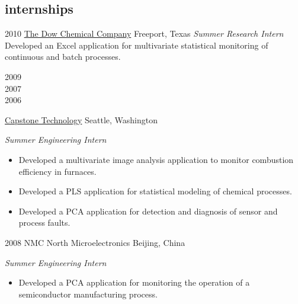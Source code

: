 \documentclass[]{../friggeri-cv} %
\begin{document}

\subsection{internships}

\begin{entrylist}

\entry
{2010}
{\href{http://www.dow.com/}{The Dow Chemical Company}}
{Freeport, Texas}
{\emph{Summer Research Intern} \\
Developed an Excel application for multivariate statistical monitoring of continuous and batch processes.}


\entry
{\begin{minipage}[t]{2cm}2009 \\ 2007 \\ 2006\end{minipage}}
{\href{http://www.capstonetechnology.com}{Capstone Technology}}
{Seattle, Washington}
{\emph{Summer Engineering Intern}
\begin{itemize}
	\item Developed a multivariate image analysis application to monitor combustion efficiency in furnaces.
	\item Developed a PLS application for statistical modeling of chemical processes.
	\item Developed a PCA application for detection and diagnosis of sensor and process faults.
\end{itemize}}


\entry
{2008}
{NMC North Microelectronics}
{Beijing, China}
{\emph{Summer Engineering Intern}
\begin{itemize}
	\item Developed a PCA application for monitoring the operation of a semiconductor manufacturing process.
\end{itemize}}





\end{entrylist}

\end{document}
